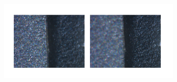 \begin{figure}[H]
	\centering
	\caption{\label{fig:card_set_images}Card contact pad images: contact pad (a), left and right sharp sides (b) .}
	\begin{subfigure}{.5\textwidth}
        \centering
        \caption{}
    \end{subfigure}\\
    \begin{subfigure}{\textwidth}
         \centering
         \includegraphics[scale=0.5, trim = {0 0cm 0 0cm}]{images/fig18b.png}
         \caption{}
    \end{subfigure}
	    \fautor
\end{figure}


